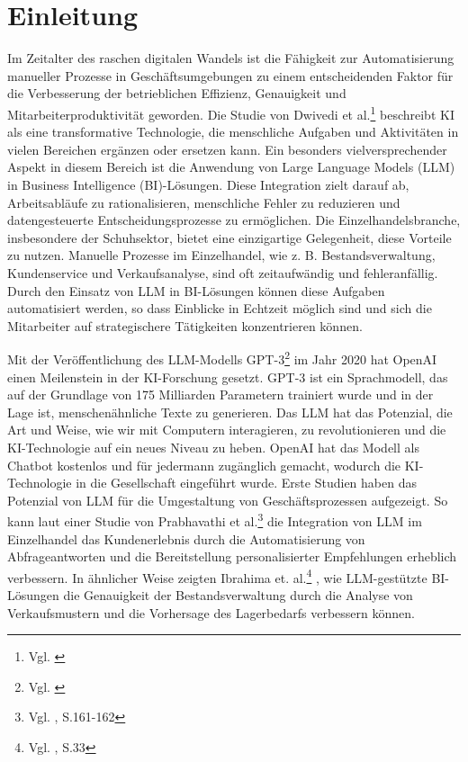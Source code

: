 

\section{Einleitung} 
\label{sec:einleitung}

Im Zeitalter des raschen digitalen Wandels ist die Fähigkeit zur Automatisierung manueller Prozesse in Geschäftsumgebungen zu einem entscheidenden Faktor für die Verbesserung der betrieblichen Effizienz, Genauigkeit und Mitarbeiterproduktivität geworden. Die Studie von Dwivedi et al.\footnote{Vgl. \cite{DwivediHughes2021}} beschreibt KI als eine transformative Technologie, die menschliche Aufgaben und Aktivitäten in vielen Bereichen ergänzen oder ersetzen kann. Ein besonders vielversprechender Aspekt in diesem Bereich ist die Anwendung von Large Language Models (LLM) in Business Intelligence (BI)-Lösungen. Diese Integration zielt darauf ab, Arbeitsabläufe zu rationalisieren, menschliche Fehler zu reduzieren und datengesteuerte Entscheidungsprozesse zu ermöglichen. 
Die Einzelhandelsbranche, insbesondere der Schuhsektor, bietet eine einzigartige Gelegenheit, diese Vorteile zu nutzen. Manuelle Prozesse im Einzelhandel, wie z. B. Bestandsverwaltung, Kundenservice und Verkaufsanalyse, sind oft zeitaufwändig und fehleranfällig. Durch den Einsatz von LLM in BI-Lösungen können diese Aufgaben automatisiert werden, so dass Einblicke in Echtzeit möglich sind und sich die Mitarbeiter auf strategischere Tätigkeiten konzentrieren können.


Mit der Veröffentlichung des LLM-Modells GPT-3\footnote{Vgl. \cite{Brown2020}} im Jahr 2020 hat OpenAI einen Meilenstein in der KI-Forschung gesetzt. GPT-3 ist ein Sprachmodell, das auf der Grundlage von 175 Milliarden Parametern trainiert wurde und in der Lage ist, menschenähnliche Texte zu generieren. Das LLM hat das Potenzial, die Art und Weise, wie wir mit Computern interagieren, zu revolutionieren und die KI-Technologie auf ein neues Niveau zu heben. OpenAI hat das Modell als Chatbot kostenlos und für jedermann zugänglich gemacht, wodurch die KI-Technologie in die Gesellschaft eingeführt wurde. Erste Studien haben das Potenzial von LLM für die Umgestaltung von Geschäftsprozessen aufgezeigt. So kann laut einer Studie von Prabhavathi et al.\footnote{Vgl. \cite{Prabhavathi2019}, S.161-162} die Integration von LLM im Einzelhandel das Kundenerlebnis durch die Automatisierung von Abfrageantworten und die Bereitstellung personalisierter Empfehlungen erheblich verbessern. In ähnlicher Weise zeigten Ibrahima et. al.\footnote{Vgl. \cite{Ibrahima2021}, S.33} , wie LLM-gestützte BI-Lösungen die Genauigkeit der Bestandsverwaltung durch die Analyse von Verkaufsmustern und die Vorhersage des Lagerbedarfs verbessern können.

